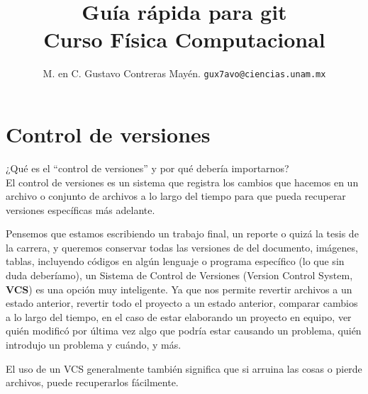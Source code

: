 
\hypersetup{
    colorlinks=true,
    linkcolor=blue,
    filecolor=magenta,      
    urlcolor=red,
    }
\usepackage{minted}

\title{\vspace{-2cm}Guía rápida para git \\ {\large Curso Física Computacional} \vspace{-3ex}}
\author{M. en C. Gustavo Contreras Mayén. \texttt{gux7avo@ciencias.unam.mx}}
\date{}



\fontsize{14}{14}\selectfont
\vspace{-4cm}
\maketitle

\section{Control de versiones}

¿Qué es el \enquote{control de versiones} y por qué debería importarnos?
\\
El control de versiones es un sistema que registra los cambios que hacemos en un archivo o conjunto de archivos a lo largo del tiempo para que pueda recuperar versiones específicas más adelante.
\par
Pensemos que estamos escribiendo un trabajo final, un reporte o quizá la tesis de la carrera, y queremos conservar todas las versiones de del documento, imágenes, tablas, incluyendo códigos en algún lenguaje o programa específico (lo que sin duda deberíamo), un Sistema de Control de Versiones (Version Control System, \textbf{VCS}) es una opción muy inteligente. Ya que nos permite revertir archivos a un estado anterior, revertir todo el proyecto a un estado anterior, comparar cambios a lo largo del tiempo, en el caso de estar elaborando un proyecto en equipo, ver quién modificó por última vez algo que podría estar causando un problema, quién introdujo un problema y cuándo, y más.
\par
El uso de un VCS generalmente también significa que si arruina las cosas o pierde archivos, puede recuperarlos fácilmente. 

